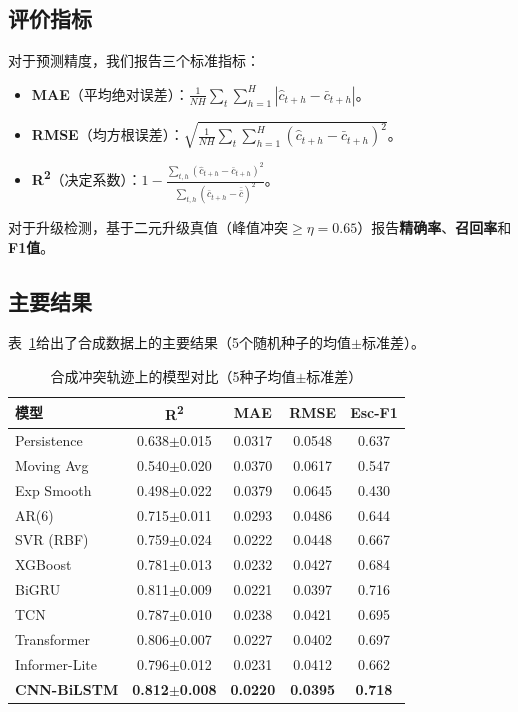 \documentclass[conference]{IEEEtran}
\begin{document}
\subsection{评价指标}

对于预测精度，我们报告三个标准指标：

\begin{itemize}
\item \textbf{MAE}（平均绝对误差）：$\frac{1}{N H}\sum_{t}\sum_{h=1}^{H}|\hat{c}_{t+h}-\bar{c}_{t+h}|$。
\item \textbf{RMSE}（均方根误差）：$\sqrt{\frac{1}{N H}\sum_{t}\sum_{h=1}^{H}(\hat{c}_{t+h}-\bar{c}_{t+h})^2}$。
\item \textbf{R\textsuperscript{2}}（决定系数）：$1 - \frac{\sum_{t,h}(\hat{c}_{t+h}-\bar{c}_{t+h})^2}{\sum_{t,h}(\bar{c}_{t+h}-\bar{\bar{c}})^2}$。
\end{itemize}

对于升级检测，基于二元升级真值（峰值冲突$\ge\eta{=}0.65$）报告\textbf{精确率}、\textbf{召回率}和\textbf{F1值}。

\subsection{主要结果}

表~\ref{tab:main_results}给出了合成数据上的主要结果（5个随机种子的均值$\pm$标准差）。

\begin{table}[h]
\caption{合成冲突轨迹上的模型对比（5种子均值$\pm$标准差）}
\label{tab:main_results}
\centering
\begin{tabular}{lcccc}
\hline
\textbf{模型} & \textbf{R\textsuperscript{2}} & \textbf{MAE} & \textbf{RMSE} & \textbf{Esc-F1} \\
\hline
Persistence & 0.638$\pm$0.015 & 0.0317 & 0.0548 & 0.637 \\
Moving Avg & 0.540$\pm$0.020 & 0.0370 & 0.0617 & 0.547 \\
Exp Smooth & 0.498$\pm$0.022 & 0.0379 & 0.0645 & 0.430 \\
AR(6) & 0.715$\pm$0.011 & 0.0293 & 0.0486 & 0.644 \\
SVR (RBF) & 0.759$\pm$0.024 & 0.0222 & 0.0448 & 0.667 \\
XGBoost & 0.781$\pm$0.013 & 0.0232 & 0.0427 & 0.684 \\
BiGRU & 0.811$\pm$0.009 & 0.0221 & 0.0397 & 0.716 \\
TCN & 0.787$\pm$0.010 & 0.0238 & 0.0421 & 0.695 \\
Transformer & 0.806$\pm$0.007 & 0.0227 & 0.0402 & 0.697 \\
Informer-Lite & 0.796$\pm$0.012 & 0.0231 & 0.0412 & 0.662 \\
\textbf{CNN-BiLSTM} & \textbf{0.812}$\pm$\textbf{0.008} & \textbf{0.0220} & \textbf{0.0395} & \textbf{0.718} \\
\hline
\end{tabular}
\end{table}
\end{document}
